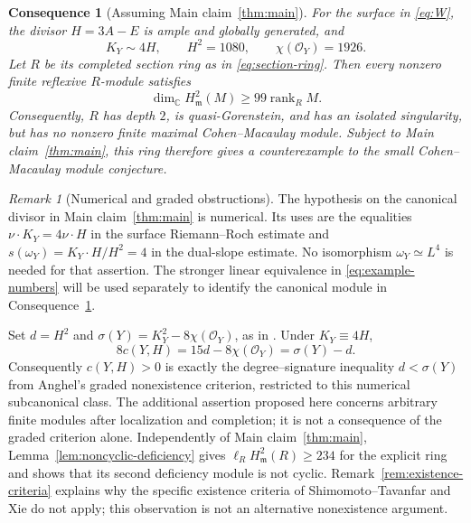 \documentclass[11pt,reqno]{amsart}
\numberwithin{equation}{section}
\newtheorem{consequence}[theorem]{Consequence}
\theoremstyle{definition}
\theoremstyle{remark}
\newtheorem{remark}[theorem]{Remark}
\newcommand{\C}{\mathbb C}
\newcommand{\OO}{\mathcal O}
\newcommand{\mm}{\mathfrak m}
\newcommand{\rk}{\operatorname{rank}}
\newcommand{\len}{\ell}
\begin{document}
\begin{consequence}[Assuming Main claim~\ref{thm:main}]\label{cor:example}
For the surface in \eqref{eq:W}, the divisor $H=3A-E$ is ample and
globally generated, and
\begin{equation}\label{eq:example-numbers}
 K_Y\sim4H,\qquad H^2=1080,\qquad \chi(\OO_Y)=1926.
\end{equation}
Let $R$ be its completed section ring as in \eqref{eq:section-ring}.
Then every nonzero finite reflexive $R$-module satisfies
\begin{equation}\label{eq:99}
 \dim_\C H^2_\mm(M)\geq99\rk_R M.
\end{equation}
Consequently, $R$ has depth $2$, is quasi-Gorenstein, and has an isolated
singularity, but has no nonzero finite maximal Cohen--Macaulay module.
Subject to Main claim~\ref{thm:main}, this ring therefore gives a
counterexample to the small Cohen--Macaulay module conjecture.
\end{consequence}

\begin{remark}[Numerical and graded obstructions]\label{rem:numerical}
The hypothesis on the canonical divisor in Main claim~\ref{thm:main}
is numerical. Its uses are the equalities
$\nu\cdot K_Y=4\nu\cdot H$ in the surface Riemann--Roch estimate
and $s(\omega_Y)=K_Y\cdot H/H^2=4$ in the dual-slope estimate.
No isomorphism $\omega_Y\simeq L^4$ is needed for that assertion.
The stronger linear equivalence in \eqref{eq:example-numbers}
will be used separately to identify the canonical module in
Consequence~\ref{cor:example}.

Set $d=H^2$ and $\sigma(Y)=K_Y^2-8\chi(\OO_Y)$, as in
\cite[Section 1 and Remark 1.6]{Anghel2026}. Under $K_Y\equiv4H$,
\[
 8c(Y,H)=15d-8\chi(\OO_Y)=\sigma(Y)-d.
\]
Consequently $c(Y,H)>0$ is exactly the degree--signature inequality
$d<\sigma(Y)$ from Anghel's graded nonexistence criterion, restricted
to this numerical subcanonical class. The additional assertion proposed
here concerns arbitrary finite modules after localization and completion;
it is not a consequence of the graded criterion alone.
Independently of Main claim~\ref{thm:main},
Lemma~\ref{lem:noncyclic-deficiency} gives
$\len_RH^2_\mm(R)\geq234$ for the explicit ring and shows that its second
deficiency module is not cyclic. Remark~\ref{rem:existence-criteria}
explains why the specific existence criteria of Shimomoto--Tavanfar
and Xie do not apply; this observation is not an alternative
nonexistence argument.
\end{remark}
\end{document}
